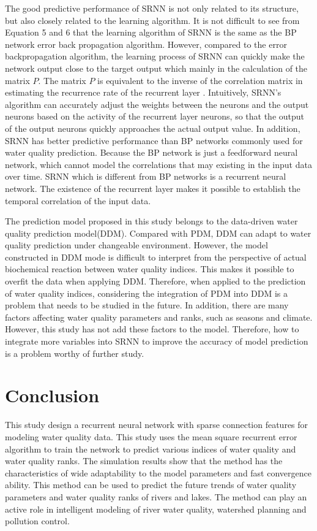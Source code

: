 \documentclass[runningheads]{llncs}
\begin{document}
The good predictive performance of SRNN is not only related to 
its structure, but also closely related to the learning algorithm.
It is not difficult to see from Equation 5 and 6 that the 
learning algorithm of SRNN is the same as the BP network error 
back propagation algorithm. However, compared to the error 
backpropagation algorithm, the learning process of SRNN can 
quickly make the network output close to the target output 
which mainly in the calculation of the matrix $P$. The matrix $P$ 
is equivalent to the inverse of the correlation matrix in 
estimating the recurrence rate of the recurrent layer \cite{RN23}. 
Intuitively, SRNN's algorithm can accurately adjust the weights 
between the neurons and the output neurons based on the activity 
of the recurrent layer neurons, so that the output of the 
output neurons quickly approaches the actual output value. 
In addition, SRNN has better predictive performance than BP 
networks commonly used for water quality prediction. Because 
the BP network is just a feedforward neural network, which 
cannot model the correlations that may existing in the input data 
over time. SRNN which is different from BP networks is a recurrent neural 
network. The existence of the recurrent layer makes it possible 
to establish the temporal correlation of the input data. 

The prediction model proposed in this study belongs to the 
data-driven water quality prediction model(DDM). Compared with
PDM, DDM can adapt to water quality prediction under changeable 
environment. However, the model constructed in DDM mode is 
difficult to interpret from the perspective of actual biochemical 
reaction between water quality indices. This makes it possible
to overfit the data when applying DDM. Therefore, when applied to 
the prediction of water quality indices, considering the integration 
of PDM into DDM is a problem that needs to be studied in the future.
In addition, there are many factors affecting water quality parameters 
and ranks, such as seasons and climate. However, this study has not add 
these factors to the model. Therefore, how to integrate more variables 
into SRNN to improve the accuracy of model prediction is a problem 
worthy of further study.  

\section{Conclusion}
This study design a recurrent neural network with sparse
connection features for modeling water quality data. 
This study uses the mean square recurrent error algorithm 
to train the network to predict various indices of water 
quality and water quality ranks. The simulation results 
show that the method has the characteristics of wide 
adaptability to the model parameters and fast convergence ability.
This method can be used to predict the future trends of
water quality parameters and water quality ranks of 
rivers and lakes. The method can play an active role 
in intelligent modeling of river water quality, 
watershed planning and pollution control.
%
%
%
 
 
\end{document}
